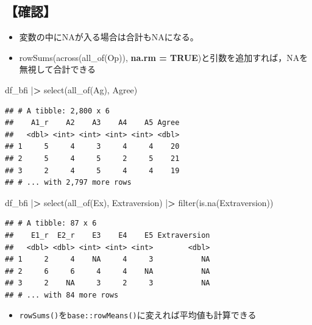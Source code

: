 \documentclass[
  xelatex,ja=standard, b5paper]{bxjsbook}
\newenvironment{Shaded}{\begin{snugshade}}{\end{snugshade}}
\newcommand{\ErrorTok}[1]{\textcolor[rgb]{0.64,0.00,0.00}{\textbf{#1}}}
\newcommand{\FunctionTok}[1]{\textcolor[rgb]{0.00,0.00,0.00}{#1}}
\newcommand{\NormalTok}[1]{#1}
\newcommand{\SpecialCharTok}[1]{\textcolor[rgb]{0.00,0.00,0.00}{#1}}
\providecommand{\tightlist}{%
  \setlength{\itemsep}{0pt}\setlength{\parskip}{0pt}}
\begin{document}
\hypertarget{ux78baux8a8d}{%
\subsection{【確認】}\label{ux78baux8a8d}}

\begin{itemize}
\tightlist
\item
  変数の中にNAが入る場合は合計もNAになる。
\item
  rowSums(across(all\_of(Op)), \textbf{na.rm = TRUE})と引数を追加すれば，NAを無視して合計できる
\end{itemize}

\begin{Shaded}
\begin{Highlighting}[]
\NormalTok{df\_bfi }\SpecialCharTok{|}\ErrorTok{\textgreater{}} \FunctionTok{select}\NormalTok{(}\FunctionTok{all\_of}\NormalTok{(Ag), Agree)}
\end{Highlighting}
\end{Shaded}

\begin{verbatim}
## # A tibble: 2,800 x 6
##    A1_r    A2    A3    A4    A5 Agree
##   <dbl> <int> <int> <int> <int> <dbl>
## 1     5     4     3     4     4    20
## 2     5     4     5     2     5    21
## 3     2     4     5     4     4    19
## # ... with 2,797 more rows
\end{verbatim}

\begin{Shaded}
\begin{Highlighting}[]
\NormalTok{df\_bfi }\SpecialCharTok{|}\ErrorTok{\textgreater{}} 
  \FunctionTok{select}\NormalTok{(}\FunctionTok{all\_of}\NormalTok{(Ex), Extraversion) }\SpecialCharTok{|}\ErrorTok{\textgreater{}} 
  \FunctionTok{filter}\NormalTok{(}\FunctionTok{is.na}\NormalTok{(Extraversion))}
\end{Highlighting}
\end{Shaded}

\begin{verbatim}
## # A tibble: 87 x 6
##    E1_r  E2_r    E3    E4    E5 Extraversion
##   <dbl> <dbl> <int> <int> <int>        <dbl>
## 1     2     4    NA     4     3           NA
## 2     6     6     4     4    NA           NA
## 3     2    NA     3     2     3           NA
## # ... with 84 more rows
\end{verbatim}

\begin{itemize}
\tightlist
\item
  \texttt{rowSums()}を\texttt{base::rowMeans()}に変えれば平均値も計算できる
\end{itemize}
\end{document}
